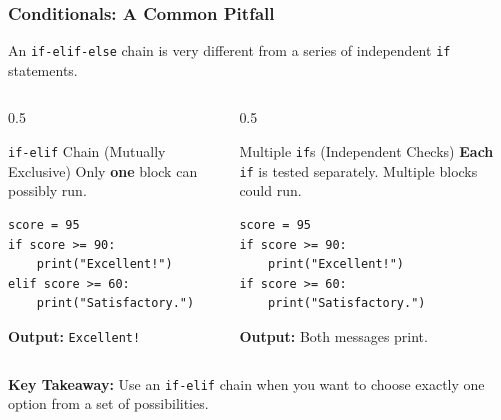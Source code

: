 \documentclass{beamer}
\begin{document}
\begin{frame}[fragile]
    \frametitle{Conditionals: A Common Pitfall}
    An \texttt{if-elif-else} chain is very different from a series of independent \texttt{if} statements.
    
    \begin{columns}[T]
        \begin{column}{0.5\textwidth}
            \begin{block}{\texttt{if-elif} Chain (Mutually Exclusive)}
                Only \textbf{one} block can possibly run.
\begin{verbatim}
score = 95
if score >= 90:
    print("Excellent!")
elif score >= 60:
    print("Satisfactory.")
\end{verbatim}
                \textbf{Output:} \texttt{Excellent!}
            \end{block}
        \end{column}
        \begin{column}{0.5\textwidth}
            \begin{block}{Multiple \texttt{if}s (Independent Checks)}
                \textbf{Each} \texttt{if} is tested separately. Multiple blocks could run.
\begin{verbatim}
score = 95
if score >= 90:
    print("Excellent!")
if score >= 60:
    print("Satisfactory.")
\end{verbatim}
                \textbf{Output:} Both messages print.
            \end{block}
        \end{column}
    \end{columns}
    
    \vspace{1em}
    \textbf{Key Takeaway:} Use an \texttt{if-elif} chain when you want to choose exactly one option from a set of possibilities.
\end{frame}
\end{document}
